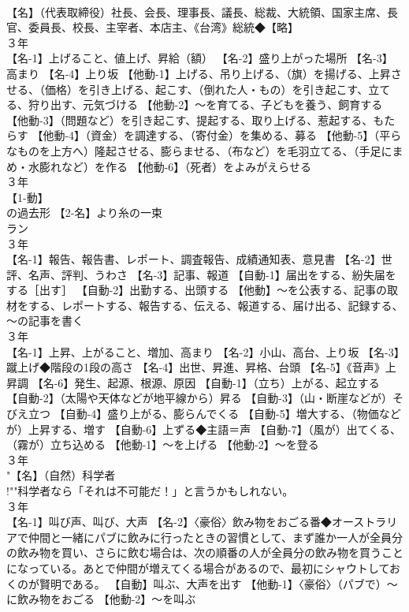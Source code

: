 \documentclass[8pt]{extreport}
\begin{document}
\begin{CJK}{UTF8}{min}
\\	【名】（代表取締役）社長、会長、理事長、議長、総裁、大統領、国家主席、長官、委員長、校長、主宰者、本店主、《台湾》総統◆【略】
\\	３年	
\\	【名-1】上げること、値上げ、昇給（額） 【名-2】盛り上がった場所 【名-3】高まり 【名-4】上り坂 【他動-1】上げる、吊り上げる、（旗）を揚げる、上昇させる、（価格）を引き上げる、起こす、（倒れた人・もの）を引き起こす、立てる、狩り出す、元気づける 【他動-2】～を育てる、子どもを養う、飼育する 【他動-3】（問題など）を引き起こす、提起する、取り上げる、惹起する、もたらす 【他動-4】（資金）を調達する、（寄付金）を集める、募る 【他動-5】（平らなものを上方へ）隆起させる、膨らませる、（布など）を毛羽立てる、（手足にまめ・水膨れなど）を作る 【他動-6】（死者）をよみがえらせる
\\	３年	
\\	【1-動】
\\	の過去形 【2-名】より糸の一束 
\\	ラン
\\	３年	
\\	【名-1】報告、報告書、レポート、調査報告、成績通知表、意見書 【名-2】世評、名声、評判、うわさ 【名-3】記事、報道 【自動-1】届出をする、紛失届をする［出す］ 【自動-2】出勤する、出頭する 【他動】～を公表する、記事の取材をする、レポートする、報告する、伝える、報道する、届け出る、記録する、～の記事を書く
\\	３年	
\\	【名-1】上昇、上がること、増加、高まり 【名-2】小山、高台、上り坂 【名-3】蹴上げ◆階段の1段の高さ 【名-4】出世、昇進、昇格、台頭 【名-5】《音声》上昇調 【名-6】発生、起源、根源、原因 【自動-1】（立ち）上がる、起立する 【自動-2】（太陽や天体などが地平線から）昇る 【自動-3】（山・断崖などが）そびえ立つ 【自動-4】盛り上がる、膨らんでくる 【自動-5】増大する、（物価などが）上昇する、増す 【自動-6】上ずる◆主語＝声 【自動-7】（風が）出てくる、（霧が）立ち込める 【他動-1】～を上げる 【他動-2】～を登る
\\	３年	
\\	"【名】（自然）科学者 
\\	!""科学者なら「それは不可能だ！」と言うかもしれない。
\\	３年	
\\	【名-1】叫び声、叫び、大声 【名-2】〈豪俗〉飲み物をおごる番◆オーストラリアで仲間と一緒にパブに飲みに行ったときの習慣として、まず誰か一人が全員分の飲み物を買い、さらに飲む場合は、次の順番の人が全員分の飲み物を買うことになっている。あとで仲間が増えてくる場合があるので、最初にシャウトしておくのが賢明である。 【自動】叫ぶ、大声を出す 【他動-1】〈豪俗〉（パブで）～に飲み物をおごる 【他動-2】～を叫ぶ

\end{CJK}
\end{document}
